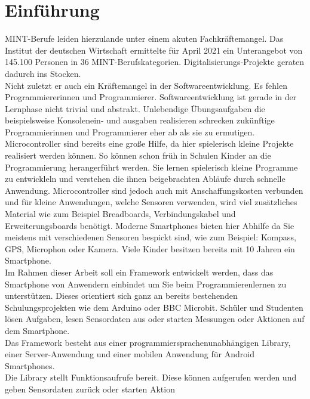 \documentclass[11pt,a4paper]{report}
\begin{document}
\chapter{Einführung} \label{chap:intro}
MINT-Berufe leiden hierzulande unter einem akuten Fachkräftemangel.
Das Institut der deutschen Wirtschaft ermittelte für April 2021 ein Unterangebot von 145.100 Personen \cite{mint_jahresreport} in 36 MINT-Berufskategorien. 
Digitalisierungs-Projekte geraten dadurch ins Stocken.
\\
Nicht zuletzt er auch ein Kräftemangel in der Softwareentwicklung.
Es fehlen Programmiererinnen und Programmierer.
Softwareentwicklung ist gerade in der Lernphase nicht trivial und abstrakt.
Unlebendige Übungsaufgaben die beispielsweise Konsolenein- und ausgaben realisieren schrecken zukünftige Programmierinnen und Programmierer eher ab als sie zu ermutigen.
\\
Microcontroller sind bereits eine große Hilfe, da hier spielerisch kleine Projekte realisiert werden können.
So können schon früh in Schulen Kinder an die Programmierung herangerführt werden.
Sie lernen spielerisch kleine Programme zu entwickleln und verstehen die ihnen beigebrachten Abläufe durch schnelle Anwendung.
Microcontroller sind jedoch auch mit Anschaffungskosten verbunden und für kleine Anwendungen, welche Sensoren verwenden, wird viel zusätzliches Material wie zum Beispiel Breadboards, Verbindungskabel und Erweiterungsboards benötigt.
Moderne Smartphones bieten hier Abhilfe da Sie meistens mit verschiedenen Sensoren bespickt sind, wie zum Beispiel: Kompass, GPS, Microphon oder Kamera.
Viele Kinder besitzen bereits mit 10 Jahren \cite{bitkom_smartphones} ein Smartphone. 
\\
Im Rahmen dieser Arbeit soll ein Framework entwickelt werden, dass das Smartphone von Anwendern einbindet um Sie beim Programmierenlernen zu unterstützen.
Dieses orientiert sich ganz an bereits bestehenden Schulungsprojekten wie dem Arduino oder BBC Microbit.
Schüler und Studenten lösen Aufgaben, lesen Sensordaten aus oder starten Messungen oder Aktionen auf dem Smartphone.
\\
Das Framework besteht aus einer programmiersprachenunabhängigen Library, einer Server-Anwendung und einer mobilen Anwendung für Android Smartphones.
\\
Die Library stellt Funktionsaufrufe bereit.
Diese können aufgerufen werden und geben Sensordaten zurück oder starten Aktion 
\end{document}
